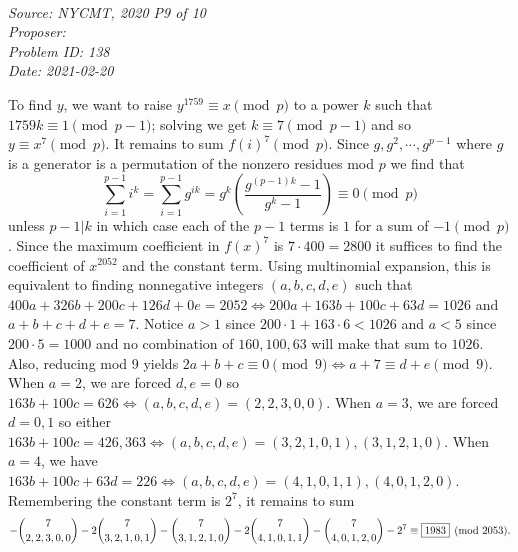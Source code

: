 \SSbreak\\
\emph{Source: NYCMT, 2020 P9 of 10}\\
\emph{Proposer: \Pnjoy}\\
\emph{Problem ID: 138}\\
\emph{Date: 2021-02-20}\\
\SSbreak

\bigskip

\begin{solution}\hfil\medskip

    To find $y$, we want to raise $y^{1759} \equiv x \pmod{p}$ to a power $k$ such that $1759k \equiv 1 \pmod{p - 1}$; solving we get $k \equiv 7 \pmod{p - 1}$
    and so $y \equiv x^7 \pmod{p}$. It remains to sum $f(i)^7 \pmod{p}$. Since $g, g^2, \cdots , g^{p - 1}$ where $g$ is a generator is a permutation of the nonzero residues mod $p$
    we find that $$\sum_{i = 1}^{p - 1} i^k = \sum_{i = 1}^{p - 1} g^{ik} = g^k \left(\dfrac{g^{(p - 1)k} - 1}{g^k - 1}\right) \equiv 0 \pmod{p}$$ unless $p - 1 | k$
    in which case each of the $p - 1$ terms is $1$ for a sum of $-1 \pmod{p}$. Since the maximum coefficient in $f(x)^7$ is $7 \cdot 400 = 2800$ it suffices to
    find the coefficient of $x^{2052}$ and the constant term. Using multinomial expansion, this is equivalent to finding nonnegative integers $(a, b, c, d, e)$ 
    such that $400a + 326b + 200c + 126d + 0e = 2052 \iff 200a + 163b + 100c + 63d = 1026$ and $a + b + c + d + e = 7$. Notice $a > 1$ since $200 \cdot 1 + 163 \cdot 6 < 1026$ and 
    $a < 5$ since $200 \cdot 5 = 1000$ and no combination of $160, 100, 63$ will make that sum to $1026$. Also, reducing mod 9 yields $2a + b + c \equiv 0 \pmod{9} \iff a + 7 \equiv d + e \pmod{9}.$
    When $a = 2$, we are forced $d, e = 0$ so $163b + 100c = 626 \iff (a, b, c, d, e) = (2, 2, 3, 0, 0)$.
    When $a = 3$, we are forced $d = 0, 1$ so either $163b + 100c = 426, 363 \iff (a, b, c, d, e) = (3, 2, 1, 0, 1), (3, 1, 2, 1, 0)$.
    When $a = 4$, we have $163b + 100c + 63d = 226 \iff (a, b, c, d, e) = (4, 1, 0, 1, 1), (4, 0, 1, 2, 0)$.
    Remembering the constant term is $2^7$, it remains to sum 
    $$-\dbinom{7}{2, 2, 3, 0, 0} - 2\dbinom{7}{3, 2, 1, 0, 1} - \dbinom{7}{3, 1, 2, 1, 0} - 2\dbinom{7}{4, 1, 0, 1, 1} - \dbinom{7}{4, 0, 1, 2, 0} - 2^7 \equiv \boxed{1983} \pmod{2053}.$$
\end{solution}\bigskip

